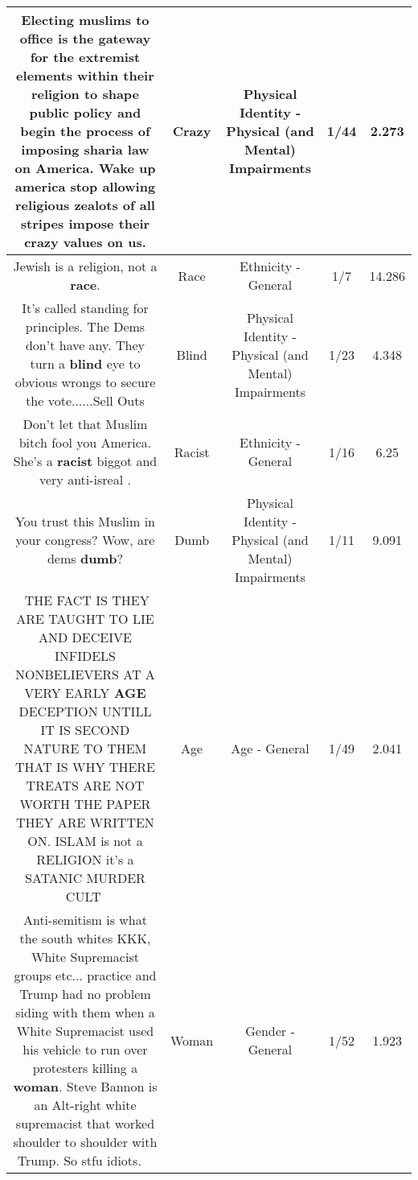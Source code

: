 \documentclass[11pt]{article}
\newlength\mylength
\begin{document}
\begin{center}
\begin{longtable}{|C{.65\mylength}|C{.30\mylength}|C{.12\mylength}|C{.12\mylength}|C{.12\mylength}|}
  \small Electing muslims to office is the gateway for the extremist elements within their religion to shape public policy and begin the process of imposing sharia law on America. Wake up america stop allowing religious zealots of all stripes impose their \textbf{crazy} values on us.\normalsize   & Crazy & Physical Identity - Physical (and Mental) Impairments & 1/44 & 2.273 \\  \hline
  \small Jewish is a religion, not a \textbf{race}.\normalsize   & Race & Ethnicity - General & 1/7 & 14.286 \\  \hline
  \small It's called standing for principles.   The Dems don't have any.    They turn a \textbf{blind} eye to obvious wrongs to secure the vote......Sell Outs\normalsize   & Blind & Physical Identity - Physical (and Mental) Impairments & 1/23 & 4.348 \\  \hline
  \small Don't let that Muslim bitch fool you America. She's a \textbf{racist} biggot and very anti-isreal .\normalsize   & Racist & Ethnicity - General & 1/16 & 6.25 \\  \hline
  \small You trust this Muslim in your congress? Wow, are dems \textbf{dumb}?\normalsize   & Dumb & Physical Identity - Physical (and Mental) Impairments & 1/11 & 9.091 \\  \hline
  \small 🖕THE FACT IS THEY ARE TAUGHT TO LIE AND DECEIVE INFIDELS NONBELIEVERS AT A VERY EARLY \textbf{AGE} DECEPTION UNTILL IT IS SECOND NATURE TO THEM THAT IS WHY THERE TREATS ARE NOT WORTH THE PAPER THEY ARE WRITTEN ON.  ISLAM is not a RELIGION it's a SATANIC MURDER CULT👹\normalsize   & Age & Age - General & 1/49 & 2.041 \\  \hline
  \small Anti-semitism is what the south whites KKK, White Supremacist groups etc... practice and Trump had no problem siding with them when a White Supremacist used his vehicle to run over protesters killing a \textbf{woman}. Steve Bannon is an Alt-right white supremacist that worked shoulder to shoulder with Trump. So stfu idiots. 🖕😁\normalsize   & Woman & Gender - General & 1/52 & 1.923 \\  \hline

\end{longtable}
\end{center}
\end{document}
